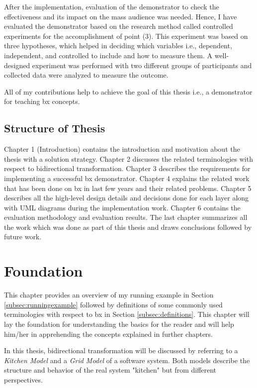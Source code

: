 After the implementation, evaluation of the demonstrator to check the effectiveness and its impact on the mass audience was needed. Hence, I have evaluated the demonstrator based on the research method called controlled experiments \cite{semethods} for the accomplishment of point (3). This experiment was based on three hypotheses, which helped in deciding which variables i.e., dependent, independent, and controlled to include and how to measure them. A well-designed experiment was performed with two different groups of participants and collected data were analyzed to measure the outcome.

All of my contributions help to achieve the goal of this thesis i.e., a demonstrator for teaching bx concepts.

\subsection{Structure of Thesis}\label{subsec:structure}

Chapter 1 (Introduction) contains the introduction and motivation about the thesis with a solution strategy. Chapter 2 discusses the related terminologies with respect to bidirectional transformation. Chapter 3 describes the requirements for implementing a successful bx demonstrator. Chapter 4 explains the related work that has been done on bx in last few years and their related problems. Chapter 5 describes all the high-level design details and decisions done for each layer along with UML diagrams during the implementation work. Chapter 6 contains the evaluation methodology and evaluation results. The last chapter summarizes all the work which was done as part of this thesis and draws conclusions followed by future work.

\clearpage
\section{Foundation}\label{sec:foundation}
This chapter provides an overview of my running example in Section \ref{subsec:runningexample} followed by definitions of some commonly used terminologies with respect to bx in Section \ref{subsec:definitions}. This chapter will lay the foundation for understanding the basics for the reader and will help him/her in apprehending the concepts explained in further chapters.

In this thesis, bidirectional transformation will be discussed by referring to a \textit{Kitchen Model} and a \textit{Grid Model} of a software system. Both models describe the structure and behavior of the real system "kitchen" but from different perspectives.

